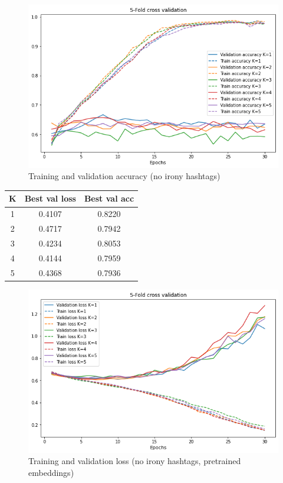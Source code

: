 \documentclass[11pt]{article}
\begin{document}
\begin{figure}[h!]
  \includegraphics[width=\columnwidth]{train_acc}
  \caption{Training and validation accuracy (no irony hashtags)}\label{fig:figure6}
\end{figure}

\begin{center}
\begin{tabular}{||c c c||}
 \hline
 K & Best val loss & Best val acc\\ [0.5ex]
 \hline\hline
 1 & 0.4107 & 0.8220 \\
 \hline
 2 & 0.4717 & 0.7942 \\
 \hline
 3 & 0.4234 & 0.8053 \\
 \hline
 4 & 0.4144 & 0.7959 \\
 \hline
 5 & 0.4368 & 0.7936 \\ [1ex]
 \hline
\end{tabular}
\end{center}

\begin{figure}[h!]
  \includegraphics[width=\columnwidth]{train_loss_pretrained}
  \caption{Training and validation loss (no irony hashtags, pretrained embeddings)}\label{fig:figure7}
\end{figure}
\end{document}
